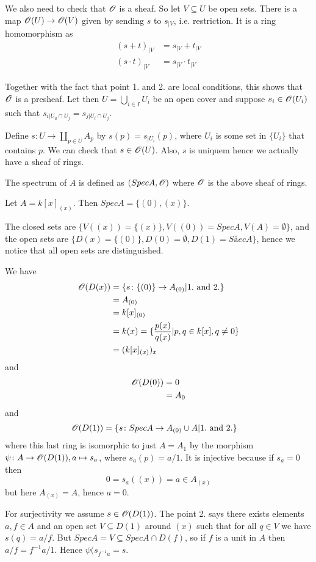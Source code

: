 We also need to check that $\mathscr{O}$ is a sheaf. So let $V\subseteq U$ be open sets. There is a map $\mathscr{O}(U)\to \mathscr{O}(V)$ given by sending $s$ to $s_{|V}$, i.e. restriction. It is a ring homomorphism as 
\begin{align*}
    (s+t)_{|V} &= s_{|V} + t_{|V} \\
    (s\cdot t)_{|V} &= s_{|V}\cdot t_{|V}
\end{align*}

Together with the fact that point 1. and 2. are local conditions, this shows that $\mathscr{O}$ is a presheaf. Let then $U=\bigcup_{i\in I}U_i$ be an open cover and suppose $s_i\in \mathscr{O}(U_i)$ such that $s_{i|U_u\cap U_j} = s_{j|U_i\cap U_j}$. 

Define $s\colon U\longrightarrow \coprod_{p\in U}A_p$ by $s(p) = s_{|U_i}(p)$, where $U_i$ is some set in $\{U_i\}$ that contains $p$. We can check that $s\in \mathscr{O}(U)$. Also, $s$ is uniquem hence we actually have a sheaf of rings. 

\begin{definition}
The spectrum of $A$ is defined as $(Spec A, \mathscr{O})$ where $\mathscr{O}$ is the above sheaf of rings. 
\end{definition}

\begin{example}
Let $A = k[x]_{(x)}$. Then $Spec A = \{ (0), (x)\}$. 

The closed sets are $\{ V((x))=\{(x)\}, V((0))=Spec A, V(A)=\emptyset \}$, and the open sets are $\{ D(x)=\{(0)\}, D(0) = \emptyset, D(1) = Såec A \}$, hence we notice that all open sets are distinguished. 

We have
\begin{align*}
    \mathscr{O}(D(x)) 
    &= \{ s\colon \{(0)\}\to A_{(0)}|1. \text{ and } 2.\} \\
    &= A_{(0)} \\
    &= k[x]_{(0)} \\
    &= k(x) = \{ \frac{p(x)}{q(x)}|p,q\in k[x], q\neq 0 \} \\
    &= (k[x]_{(x)})_x
\end{align*}
and 
\begin{align*}
    \mathscr{O}(D(0)) 
    &= 0 \\
    &= A_0
\end{align*}
and
\begin{align*}
    \mathscr{O}(D(1)) 
    &= \{ s\colon Spec A\to A_{(0)} \cup A|1. \text{ and } 2. \} 
\end{align*}
where this last ring is isomorphic to just $A = A_1$ by the morphism $\psi \colon A\to \mathscr{O}(D(1)), a\mapsto s_a$, where $s_a(p) = a/1$. It is injective because if $s_a = 0$ then 
\begin{equation*}
    0 = s_a((x)) = a\in A_{(x)}
\end{equation*}
but here $A_{(x)} = A$, hence $a=0$. 

For surjectivity we assume $s\in \mathscr{O}(D(1))$. The point 2. says there exists elements $a,f\in A$ and an open set $V\subseteq D(1)$ around $(x)$ such that for all $q\in V$ we have $s(q)=a/f$. But $Spec A = V \subseteq Spec A\cap D(f)$, so if $f$ is a unit in $A$ then $a/f = f^{-1}a/1$. Hence $\psi(s_{f^{-1}a} = s$. 
\end{example}

